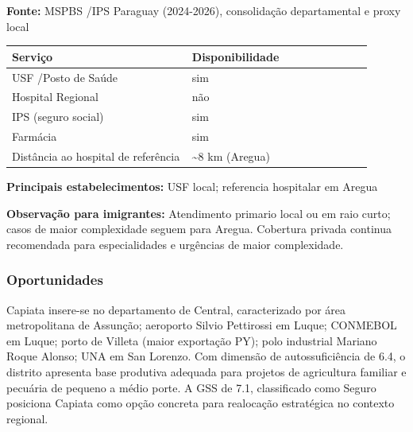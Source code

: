 \textbf{Fonte:} MSPBS /\allowbreak  IPS Paraguay (2024-2026), consolidação
departamental e proxy local

{\def\LTcaptype{none} %
\begin{longtable}{@{}>{\raggedright\arraybackslash}p{0.45\linewidth} >{\raggedright\arraybackslash}p{0.45\linewidth}@{}}
\toprule\noalign{}
Serviço & Disponibilidade \\
\midrule\noalign{}
\endhead
\bottomrule\noalign{}
\endlastfoot
USF /\allowbreak  Posto de Saúde & sim \\
Hospital Regional & não \\
IPS (seguro social) & sim \\
Farmácia & sim \\
Distância ao hospital de referência & \textasciitilde8 km (Aregua) \\
\end{longtable}
}

\textbf{Principais estabelecimentos:} USF local; referencia hospitalar
em Aregua

\textbf{Observação para imigrantes:} Atendimento primario local ou em
raio curto; casos de maior complexidade seguem para Aregua. Cobertura
privada continua recomendada para especialidades e urgências de maior
complexidade.
\newpage

\subsubsection*{Oportunidades}\label{oport-capiata-1102}
Capiata insere-se no departamento de Central, caracterizado por área metropolitana de Assunção; aeroporto Silvio Pettirossi em Luque; CONMEBOL em Luque; porto de Villeta (maior exportação PY); polo industrial Mariano Roque Alonso; UNA em San Lorenzo. Com dimensão de autossuficiência de 6.4, o distrito apresenta base produtiva adequada para projetos de agricultura familiar e pecuária de pequeno a médio porte. A GSS de 7.1, classificado como Seguro posiciona Capiata como opção concreta para realocação estratégica no contexto regional.

